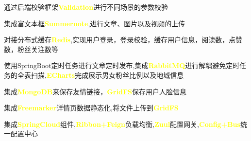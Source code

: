 \begin{cventries}
{\begin{cvitems}
			\item {通过后端校验框架\textcolor{yellow}{\textbf{Validation}}进行不同场景的参数校验}
			\item {集成富文本框\textcolor{yellow}{\textbf{Summernote}},进行文章、图片以及视频的上传}
			\item {对接分布式缓存\textcolor{yellow}{\textbf{Redis}},实现用户登录，登录校验，缓存用户信息，阅读数，点赞数，粉丝关注数等}
			\item {使用SpringBoot定时任务进行文章定时发布,集成\textcolor{yellow}{\textbf{RabbitMQ}}进行解耦避免定时任务的全表扫描,\textcolor{yellow}{\textbf{ECharts}}完成展示男女粉丝比例以及地域信息}	
			\item {集成\textcolor{yellow}{\textbf{MongoDB}}来保存友情链接，\textcolor{yellow}{\textbf{GridFS}}保存用户人脸信息}
			\item {集成\textcolor{yellow}{\textbf{Freemarker}}详情页数据静态化,将文件上传到\textcolor{yellow}{\textbf{GridFS}}}
			\item
			{集成\textcolor{yellow}{\textbf{SpringCloud}}组件,\textcolor{yellow}{\textbf{Ribbon+Feign}}负载均衡,\textcolor{yellow}{\textbf{Zuul}}配置网关,\textcolor{yellow}{\textbf{Config+Bus}}统一配置中心}
		\end{cvitems}
	}
\end{cventries}
